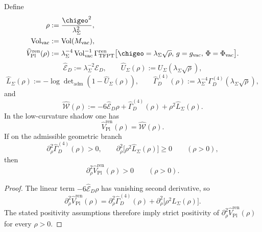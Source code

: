 \begin{lemma}
\label{lem:strict-convexity-rho-planck}
Define
\[
\begin{aligned}
\rho&:=\frac{\chigeo^2}{\lambda_\Sigma^2},
\\
\operatorname{Vol}_{\mathrm{vac}}&:=\operatorname{Vol}(M_{\mathrm{vac}}),
\\
\widehat V_{\mathrm{Pl}}^{\mathrm{ren}}(\rho)
&:=
\lambda_\Sigma^{-4}\operatorname{Vol}_{\mathrm{vac}}^{-1}
\Gamma_{\mathrm{TFPT}}^{\mathrm{ren}}
\bigl[\chigeo=\lambda_\Sigma\sqrt{\rho},\,g=g_{\mathrm{vac}},\,\Phi=\Phi_{\mathrm{vac}}\bigr].
\end{aligned}
\]
\[
\widehat{\mathcal E}_D:=\lambda_\Sigma^{-2}\mathcal E_D,
\qquad
\widehat U_\Sigma(\rho):=U_\Sigma(\lambda_\Sigma\sqrt{\rho}),
\]
\[
\widehat L_\Sigma(\rho):=-\log\det\nolimits_{\mathrm{adm}}(1-\widehat U_\Sigma(\rho)),
\qquad
\widehat\Gamma_D^{(4)}(\rho):=\lambda_\Sigma^{-4}\Gamma_D^{(4)}(\lambda_\Sigma\sqrt{\rho}),
\]
and
\[
\widehat{\mathcal W}(\rho):=
-6\widehat{\mathcal E}_D\rho
+\widehat\Gamma_D^{(4)}(\rho)
+\rho^2\widehat L_\Sigma(\rho).
\]
In the low-curvature shadow one has
\[
\widehat V_{\mathrm{Pl}}^{\mathrm{ren}}(\rho)=\widehat{\mathcal W}(\rho).
\]
If on the admissible geometric branch
\[
\partial_\rho^2\widehat\Gamma_D^{(4)}(\rho)>0,
\qquad
\partial_\rho^2\!\bigl[\rho^2\widehat L_\Sigma(\rho)\bigr]\ge 0
\qquad
(\rho>0),
\]
then
\[
\partial_\rho^2\widehat V_{\mathrm{Pl}}^{\mathrm{ren}}(\rho)>0
\qquad
(\rho>0).
\]
\end{lemma}

\begin{proof}
The linear term $-6\widehat{\mathcal E}_D\rho$ has vanishing second derivative, so
\[
\partial_\rho^2\widehat V_{\mathrm{Pl}}^{\mathrm{ren}}(\rho)
=
\partial_\rho^2\widehat\Gamma_D^{(4)}(\rho)
+
\partial_\rho^2\!\bigl[\rho^2\widehat L_\Sigma(\rho)\bigr].
\]
The stated positivity assumptions therefore imply strict positivity of
$\partial_\rho^2\widehat V_{\mathrm{Pl}}^{\mathrm{ren}}(\rho)$ for every $\rho>0$.
\end{proof}

